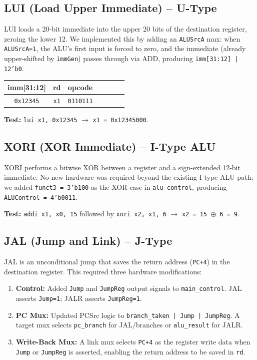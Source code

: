 \documentclass[11pt,a4paper]{article}
\begin{document}
\subsection{LUI (Load Upper Immediate) -- U-Type}

LUI loads a 20-bit immediate into the upper 20 bits of the destination register, zeroing the lower 12. We implemented this by adding an \texttt{ALUSrcA} mux: when \texttt{ALUSrcA=1}, the ALU's first input is forced to zero, and the immediate (already upper-shifted by \texttt{immGen}) passes through via ADD, producing \texttt{imm[31:12] | 12'b0}.

\begin{table}[H]
\centering\small
\begin{tabular}{ccccccc}
\toprule
\textbf{imm[31:12]} & \textbf{rd} & \textbf{opcode} \\
\midrule
\texttt{0x12345} & \texttt{x1} & \texttt{0110111} \\
\bottomrule
\end{tabular}
\end{table}

\textbf{Test:} \texttt{lui x1, 0x12345} $\rightarrow$ \texttt{x1 = 0x12345000}.

\subsection{XORI (XOR Immediate) -- I-Type ALU}

XORI performs a bitwise XOR between a register and a sign-extended 12-bit immediate. No new hardware was required beyond the existing I-type ALU path; we added \texttt{funct3 = 3'b100} as the XOR case in \texttt{alu\_control}, producing \texttt{ALUControl = 4'b0011}.

\textbf{Test:} \texttt{addi x1, x0, 15} followed by \texttt{xori x2, x1, 6} $\rightarrow$ \texttt{x2 = 15 $\oplus$ 6 = 9}.

\subsection{JAL (Jump and Link) -- J-Type}

JAL is an unconditional jump that saves the return address (\texttt{PC+4}) in the destination register. This required three hardware modifications:

\begin{enumerate}[nosep, leftmargin=1.5em]
    \item \textbf{Control:} Added \texttt{Jump} and \texttt{JumpReg} output signals to \texttt{main\_control}. JAL asserts \texttt{Jump=1}; JALR asserts \texttt{JumpReg=1}.
    \item \textbf{PC Mux:} Updated PCSrc logic to \texttt{branch\_taken | Jump | JumpReg}. A target mux selects \texttt{pc\_branch} for JAL/branches or \texttt{alu\_result} for JALR.
    \item \textbf{Write-Back Mux:} A link mux selects \texttt{PC+4} as the register write data when \texttt{Jump} or \texttt{JumpReg} is asserted, enabling the return address to be saved in \texttt{rd}.
\end{enumerate}
\end{document}
